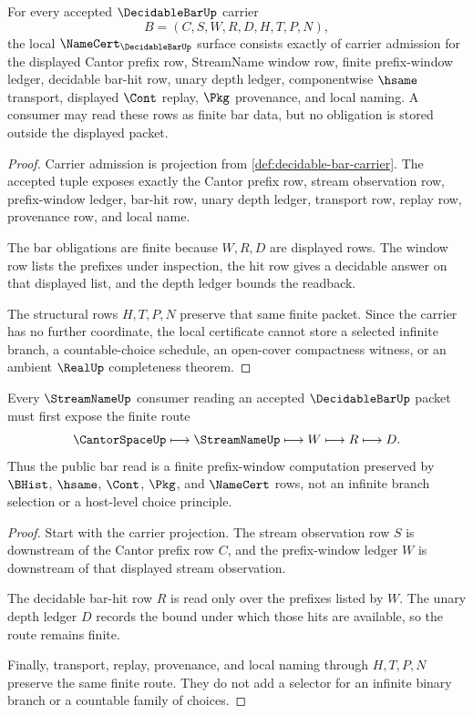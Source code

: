 \begin{theorem}
\label{thm:decidable-bar-namecert-obligations}
For every accepted $\DecidableBarUp$ carrier
$$
B=(C,S,W,R,D,H,T,P,N),
$$
the local $\NameCert_{\DecidableBarUp}$ surface consists exactly of carrier
admission for the displayed Cantor prefix row, StreamName window row, finite
prefix-window ledger, decidable bar-hit row, unary depth ledger, componentwise
$\hsame$ transport, displayed $\Cont$ replay, $\Pkg$ provenance, and local
naming. A consumer may read these rows as finite bar data, but no obligation is
stored outside the displayed packet.
\end{theorem}
\begin{proof}
Carrier admission is projection from \autoref{def:decidable-bar-carrier}. The
accepted tuple exposes exactly the Cantor prefix row, stream observation row,
prefix-window ledger, bar-hit row, unary depth ledger, transport row, replay row,
provenance row, and local name.

The bar obligations are finite because $W,R,D$ are displayed rows. The window
row lists the prefixes under inspection, the hit row gives a decidable answer on
that displayed list, and the depth ledger bounds the readback.

The structural rows $H,T,P,N$ preserve that same finite packet. Since the
carrier has no further coordinate, the local certificate cannot store a selected
infinite branch, a countable-choice schedule, an open-cover compactness witness,
or an ambient $\RealUp$ completeness theorem.
\end{proof}

\begin{theorem}
\label{thm:decidable-bar-stream-window-route}
Every $\StreamNameUp$ consumer reading an accepted $\DecidableBarUp$ packet must
first expose the finite route
$$
\CantorSpaceUp \longmapsto \StreamNameUp \longmapsto W \longmapsto R
\longmapsto D .
$$
Thus the public bar read is a finite prefix-window computation preserved by
$\BHist$, $\hsame$, $\Cont$, $\Pkg$, and $\NameCert$ rows, not an infinite branch
selection or a host-level choice principle.
\end{theorem}
\begin{proof}
Start with the carrier projection. The stream observation row $S$ is downstream
of the Cantor prefix row $C$, and the prefix-window ledger $W$ is downstream of
that displayed stream observation.

The decidable bar-hit row $R$ is read only over the prefixes listed by $W$.
The unary depth ledger $D$ records the bound under which those hits are
available, so the route remains finite.

Finally, transport, replay, provenance, and local naming through $H,T,P,N$
preserve the same finite route. They do not add a selector for an infinite
binary branch or a countable family of choices.
\end{proof}

